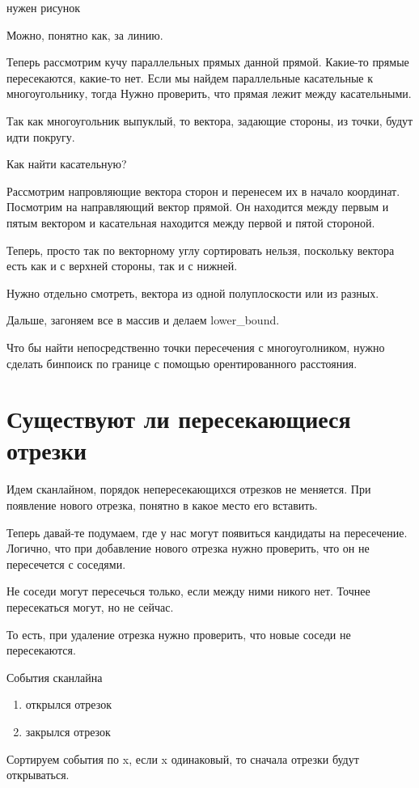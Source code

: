 {\color{red} нужен рисунок}

Можно, понятно как, за линию.

Теперь рассмотрим кучу параллельных прямых данной прямой. Какие-то прямые пересекаются, какие-то нет.
Если мы найдем параллельные касательные к многоугольнику, тогда
Нужно проверить, что прямая лежит между касательными.

Так как многоугольник выпуклый, то вектора, задающие стороны, из точки, будут идти покругу.

Как найти касательную?

Рассмотрим напровляющие вектора сторон и перенесем их в начало координат. 
Посмотрим на направляющий вектор прямой. Он находится между первым и пятым вектором и касательная находится между первой и пятой стороной.

Теперь, просто так по векторному углу сортировать нельзя, поскольку вектора есть как и с верхней стороны, так и с нижней. 

Нужно отдельно смотреть, вектора из одной полуплоскости или из разных.

Дальше, загоняем все в массив и делаем lower\_bound.

Что бы найти непосредственно точки пересечения с многоуголником, нужно сделать бинпоиск по границе с помощью орентированного расстояния.

\section{Существуют ли пересекающиеся отрезки} 

Идем сканлайном, порядок  непересекающихся отрезков не меняется. При появление нового отрезка, понятно в какое место его вставить. 

Теперь давай-те подумаем, где у нас могут появиться кандидаты на пересечение. Логично, что при добавление нового
отрезка нужно проверить, что он не пересечется с соседями. 

Не соседи могут пересечься только, если между ними никого нет. Точнее пересекаться могут, но не сейчас. 

То есть, при удаление отрезка нужно проверить, что новые соседи не пересекаются. 

События сканлайна
\begin{enumerate}
\item открылся отрезок
\item закрылся отрезок
\end{enumerate}
Сортируем события по x, если x одинаковый, то сначала отрезки будут открываться.

